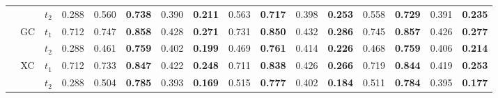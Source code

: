 \begin{table}
{\begin{tabular}{c | c | c | c | c  c | c  c | c  c | c  c | c  c | c  c}
         &
         &
        $t_2$ &
        0.288 &
        0.560 &
        \textbf{0.738} &
        0.390 &
        \textbf{0.211} &
        0.563 &
        \textbf{0.717} &
        0.398 &
        \textbf{0.253} &
        0.558 &
        \textbf{0.729} &
        0.391 &
        \textbf{0.235} \\

         &
        \multirow{2}{*}{GC} &
        $t_1$ &
        0.712 &
        0.747 &
        \textbf{0.858} &
        0.428 &
        \textbf{0.271} &
        0.731 &
        \textbf{0.850} &
        0.432 &
        \textbf{0.286} &
        0.745 &
        \textbf{0.857} &
        0.426 &
        \textbf{0.277} \\

         &
         &
        $t_2$ &
        0.288 &
        0.461 &
        \textbf{0.759} &
        0.402 &
        \textbf{0.199} &
        0.469 &
        \textbf{0.761} &
        0.414 &
        \textbf{0.226} &
        0.468 &
        \textbf{0.759} &
        0.406 &
        \textbf{0.214} \\

         &
        \multirow{2}{*}{XC} &
        $t_1$ &
        0.712 &
        0.733 &
        \textbf{0.847} &
        0.422 &
        \textbf{0.248} &
        0.711 &
        \textbf{0.838} &
        0.426 &
        \textbf{0.266} &
        0.719 &
        \textbf{0.844} &
        0.419 &
        \textbf{0.253} \\

         &
         &
        $t_2$ &
        0.288 &
        0.504 &
        \textbf{0.785} &
        0.393 &
        \textbf{0.169} &
        0.515 &
        \textbf{0.777} &
        0.402 &
        \textbf{0.184} &
        0.511 &
        \textbf{0.784} &
        0.395 &
        \textbf{0.177} \\
    \midrule
    \end{tabular} }
\end{table}